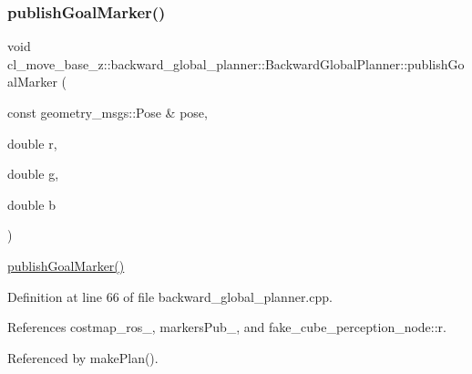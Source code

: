 \mbox{\label{classcl__move__base__z_1_1backward__global__planner_1_1BackwardGlobalPlanner_a3c6784cad10fdadf28323380fe3d6d2b}} 
\subsubsection{\texorpdfstring{publish\+Goal\+Marker()}{publishGoalMarker()}}
{\footnotesize\ttfamily void cl\+\_\+move\+\_\+base\+\_\+z\+::backward\+\_\+global\+\_\+planner\+::\+Backward\+Global\+Planner\+::publish\+Goal\+Marker (\begin{DoxyParamCaption}\item[{const geometry\+\_\+msgs\+::\+Pose \&}]{pose,  }\item[{double}]{r,  }\item[{double}]{g,  }\item[{double}]{b }\end{DoxyParamCaption})\hspace{0.3cm}{\ttfamily [private]}}

\hyperlink{classcl__move__base__z_1_1backward__global__planner_1_1BackwardGlobalPlanner_a3c6784cad10fdadf28323380fe3d6d2b}{publish\+Goal\+Marker()} 

Definition at line 66 of file backward\+\_\+global\+\_\+planner.\+cpp.



References costmap\+\_\+ros\+\_\+, markers\+Pub\+\_\+, and fake\+\_\+cube\+\_\+perception\+\_\+node\+::r.



Referenced by make\+Plan().


